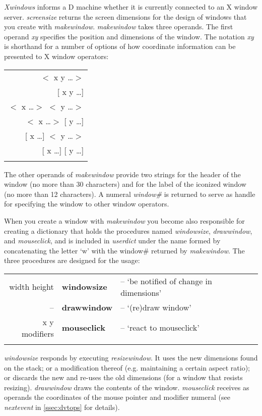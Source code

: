 \emph{Xwindows} informs a D machine whether it is currently connected to an X window server. \emph{screensize} returns the screen dimensions for the design of windows that you create with \emph{makewindow}. \emph{makewindow} takes three operands. The first operand \emph{xy} specifies the position and dimensions of the window. The notation \emph{xy} is shorthand for a number of options of how coordinate information can be presented to X window operators:\\

\begin{tabular}{>{\sffamily}r} 
$<$ x y \ldots $>$\\{}
[ x y \ldots ]\\{}
$<$ x \ldots $>$ $<$ y \ldots $>$ \\{}
$<$ x \ldots $>$ [ y \ldots ]\\{}
[ x \ldots ] $<$ y \ldots $>$\\{}
[ x \ldots ] [ y \ldots ]\\{}
\end{tabular}

The other operands of \emph{makewindow} provide two strings for the header of the window (no more than 30 characters) and for the label of the iconized window (no more than 12 characters). A numeral \emph{window\#} is returned to serve as handle for specifying the window to other window operators.

When you create a window with \emph{makewindow} you become also responsible for creating a dictionary that holds the procedures named \emph{windowsize}, \emph{drawwindow}, and \emph{mouseclick}, and is included in \emph{userdict} under the name formed by concatenating the letter `w' with the window\# returned by \emph{makewindow}. The three procedures are designed for the usage:\\

\begin{tabular}{>{\sffamily}r>{\sffamily\bfseries}l>{\sffamily}l}
width height & windowsize & -- `be notified of change in dimensions'\\
-- & drawwindow & -- `(re)draw window'\\
x y modifiers & mouseclick & -- `react to mouseclick'\\\\
\end{tabular}

\emph{windowsize} responds by executing \emph{resizewindow}. It uses the new dimensions found on the stack; or a modification thereof (e.g. maintaining a certain aspect ratio); or discards the new and re-uses the old dimensions (for a window that resists resizing). \emph{drawwindow}  draws the contents of the window. \emph{mouseclick} receives as operands the coordinates of the mouse pointer and modifier numeral (see \emph{nextevent} in \ref{ssec:dvtops} for details).

